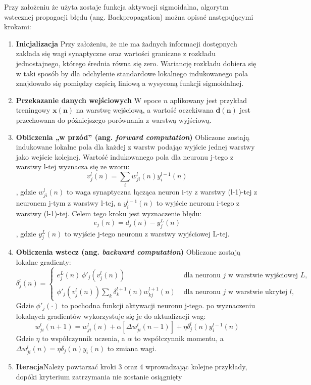 \begin{tcolorbox}[title=Algorytm wstecznej propagacji błędu (ang. Backpropagation),
    colback=blue!5!white,colframe=blue!75!black,
    breakable]
    
Przy założeniu że użyta zostaje funkcja aktywacji sigmoidalna, algorytm wstecznej propagacji błędu (ang. Backpropagation) można opisać następującymi krokami:\cite{haykin2009neural}
    \begin{enumerate}
        \item \textbf{Inicjalizacja} Przy założeniu, że nie ma żadnych informacji dostępnych zakłada się wagi synaptyczne oraz wartości graniczne z rozkładu jednostajnego, którego średnia równa się zero. Wariancję rozkładu dobiera się w taki sposób by dla odchylenie standardowe lokalnego indukowanego pola znajdowało się pomiędzy częścią liniową a wysyconą funkcji sigmoidalnej.
        \item \textbf{Przekazanie danych wejściowych} W epoce $n$ aplikowany jest przykład treningowy $\mathbf{x(n)}$ na warstwę wejściową, a wartość oczekiwana $\mathbf{d(n)}$ jest przechowana do późniejszego porównania z warstwą wyjściową.
        \item \textbf{Obliczenia „w przód” (ang. \textit{forward computation})} Obliczone zostają indukowane lokalne pola dla każdej z warstw podając wyjście jednej warstwy jako wejście kolejnej. Wartość indukowanego pola dla neuronu j-tego z warstwy l-tej wyznacza się ze wzoru: 
        \[v_j^l(n)=\sum_i{w_{ji}^l(n)y_i^{l-1}(n)}\],
        gdzie $w_{ji}^l(n)$ to waga synaptyczna łącząca neuron i-ty z warstwy (l-1)-tej z neuronem j-tym z warstwy l-tej, a $y_i^{l-1}(n)$ to wyjście neuronu i-tego z warstwy (l-1)-tej.
        Celem tego kroku jest wyznaczenie błędu:
        \[e_j(n) = d_j(n) - y_j^L(n)\],
        gdzie $y_j^L(n)$ to wyjście j-tego neuronu z warstwy wyjściowej L-tej.
        \item \textbf{Obliczenia wstecz (ang. \textit{backward computation})}
        Obliczone zostają lokalne gradienty: 
        \[
            \delta_j^l(n) =
            \begin{cases}
            e_j^L(n)\,\phi'_j(v_j^l(n)) & \text{ dla neuronu } j \text{ w warstwie wyjściowej } L, \\
            \phi'_j(v_j^l(n))\sum_k {\delta_k^{l+1}(n)w_{kj}^{l+1}(n)} & \text{ dla neuronu } j \text{ w warstwie ukrytej } l,
            \end{cases}
        \]
        Gdzie $\phi'_j(\cdot)$ to pochodna funkcji aktywacji neuronu j-tego.
        po wyznaczeniu lokalnych gradientów wykorzystuje się je do aktualizacji wag:
        \[w_{ji}^l(n+1)=w_{ji}^l(n) +\alpha\left[\Delta w_{ji}^l(n-1) \right] +\eta \delta_j^l(n)y_i^{l-1}(n) \]
        Gdzie $\eta$ to współczynnik uczenia, a $\alpha$ to współczynnik momentu, a $\Delta w_{ji}^l(n) = \eta\delta_j(n)y_i(n)$ to zmiana wagi.
        \item \textbf{Iteracja}Należy powtarzać kroki 3 oraz 4 wprowadzając kolejne przykłady, dopóki kryterium zatrzymania nie zostanie osiągnięty
    \end{enumerate}

\end{tcolorbox}

